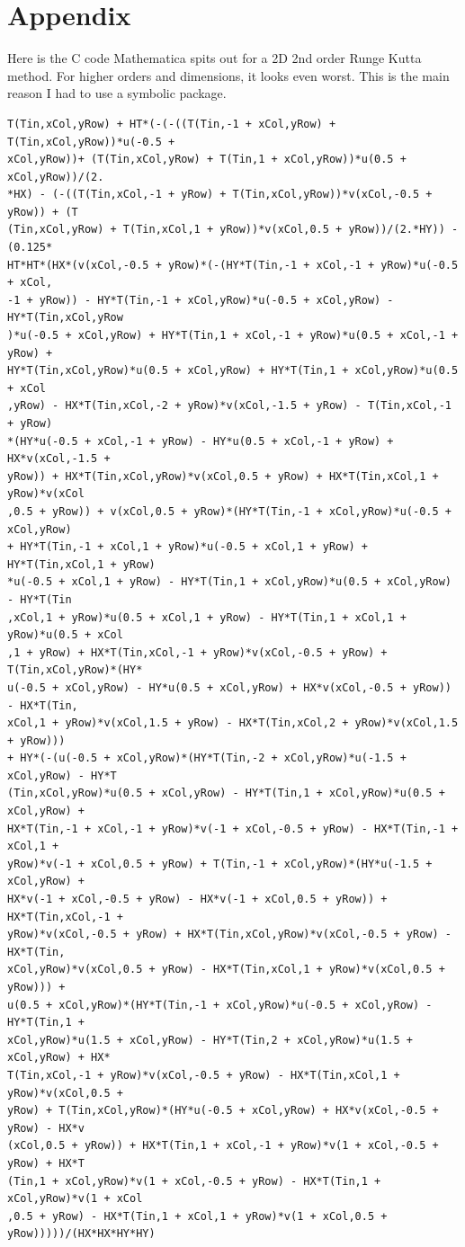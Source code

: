 \documentclass[paper=a4, fontsize=11pt]{scrartcl} %
\numberwithin{equation}{section} %
\numberwithin{figure}{section} %
\numberwithin{table}{section} %
\begin{document}
\section{Appendix}
Here is the C code Mathematica spits out for a 2D 2nd order Runge Kutta method. For higher orders and dimensions, it looks even worst.
This is the main reason I had to use a symbolic package.
\begin{verbatim}
T(Tin,xCol,yRow) + HT*(-(-((T(Tin,-1 + xCol,yRow) + T(Tin,xCol,yRow))*u(-0.5 + 
xCol,yRow))+ (T(Tin,xCol,yRow) + T(Tin,1 + xCol,yRow))*u(0.5 + xCol,yRow))/(2.
*HX) - (-((T(Tin,xCol,-1 + yRow) + T(Tin,xCol,yRow))*v(xCol,-0.5 + yRow)) + (T
(Tin,xCol,yRow) + T(Tin,xCol,1 + yRow))*v(xCol,0.5 + yRow))/(2.*HY)) - (0.125*
HT*HT*(HX*(v(xCol,-0.5 + yRow)*(-(HY*T(Tin,-1 + xCol,-1 + yRow)*u(-0.5 + xCol,
-1 + yRow)) - HY*T(Tin,-1 + xCol,yRow)*u(-0.5 + xCol,yRow) - HY*T(Tin,xCol,yRow
)*u(-0.5 + xCol,yRow) + HY*T(Tin,1 + xCol,-1 + yRow)*u(0.5 + xCol,-1 + yRow) + 
HY*T(Tin,xCol,yRow)*u(0.5 + xCol,yRow) + HY*T(Tin,1 + xCol,yRow)*u(0.5 + xCol
,yRow) - HX*T(Tin,xCol,-2 + yRow)*v(xCol,-1.5 + yRow) - T(Tin,xCol,-1 + yRow)
*(HY*u(-0.5 + xCol,-1 + yRow) - HY*u(0.5 + xCol,-1 + yRow) + HX*v(xCol,-1.5 +
yRow)) + HX*T(Tin,xCol,yRow)*v(xCol,0.5 + yRow) + HX*T(Tin,xCol,1 + yRow)*v(xCol
,0.5 + yRow)) + v(xCol,0.5 + yRow)*(HY*T(Tin,-1 + xCol,yRow)*u(-0.5 + xCol,yRow) 
+ HY*T(Tin,-1 + xCol,1 + yRow)*u(-0.5 + xCol,1 + yRow) + HY*T(Tin,xCol,1 + yRow)
*u(-0.5 + xCol,1 + yRow) - HY*T(Tin,1 + xCol,yRow)*u(0.5 + xCol,yRow) - HY*T(Tin
,xCol,1 + yRow)*u(0.5 + xCol,1 + yRow) - HY*T(Tin,1 + xCol,1 + yRow)*u(0.5 + xCol
,1 + yRow) + HX*T(Tin,xCol,-1 + yRow)*v(xCol,-0.5 + yRow) + T(Tin,xCol,yRow)*(HY*
u(-0.5 + xCol,yRow) - HY*u(0.5 + xCol,yRow) + HX*v(xCol,-0.5 + yRow)) - HX*T(Tin,
xCol,1 + yRow)*v(xCol,1.5 + yRow) - HX*T(Tin,xCol,2 + yRow)*v(xCol,1.5 + yRow)))
+ HY*(-(u(-0.5 + xCol,yRow)*(HY*T(Tin,-2 + xCol,yRow)*u(-1.5 + xCol,yRow) - HY*T
(Tin,xCol,yRow)*u(0.5 + xCol,yRow) - HY*T(Tin,1 + xCol,yRow)*u(0.5 + xCol,yRow) + 
HX*T(Tin,-1 + xCol,-1 + yRow)*v(-1 + xCol,-0.5 + yRow) - HX*T(Tin,-1 + xCol,1 + 
yRow)*v(-1 + xCol,0.5 + yRow) + T(Tin,-1 + xCol,yRow)*(HY*u(-1.5 + xCol,yRow) +
HX*v(-1 + xCol,-0.5 + yRow) - HX*v(-1 + xCol,0.5 + yRow)) + HX*T(Tin,xCol,-1 + 
yRow)*v(xCol,-0.5 + yRow) + HX*T(Tin,xCol,yRow)*v(xCol,-0.5 + yRow) - HX*T(Tin,
xCol,yRow)*v(xCol,0.5 + yRow) - HX*T(Tin,xCol,1 + yRow)*v(xCol,0.5 + yRow))) +
u(0.5 + xCol,yRow)*(HY*T(Tin,-1 + xCol,yRow)*u(-0.5 + xCol,yRow) - HY*T(Tin,1 + 
xCol,yRow)*u(1.5 + xCol,yRow) - HY*T(Tin,2 + xCol,yRow)*u(1.5 + xCol,yRow) + HX*
T(Tin,xCol,-1 + yRow)*v(xCol,-0.5 + yRow) - HX*T(Tin,xCol,1 + yRow)*v(xCol,0.5 +
yRow) + T(Tin,xCol,yRow)*(HY*u(-0.5 + xCol,yRow) + HX*v(xCol,-0.5 + yRow) - HX*v
(xCol,0.5 + yRow)) + HX*T(Tin,1 + xCol,-1 + yRow)*v(1 + xCol,-0.5 + yRow) + HX*T
(Tin,1 + xCol,yRow)*v(1 + xCol,-0.5 + yRow) - HX*T(Tin,1 + xCol,yRow)*v(1 + xCol
,0.5 + yRow) - HX*T(Tin,1 + xCol,1 + yRow)*v(1 + xCol,0.5 + yRow)))))/(HX*HX*HY*HY)
\end{verbatim}
\end{document}
